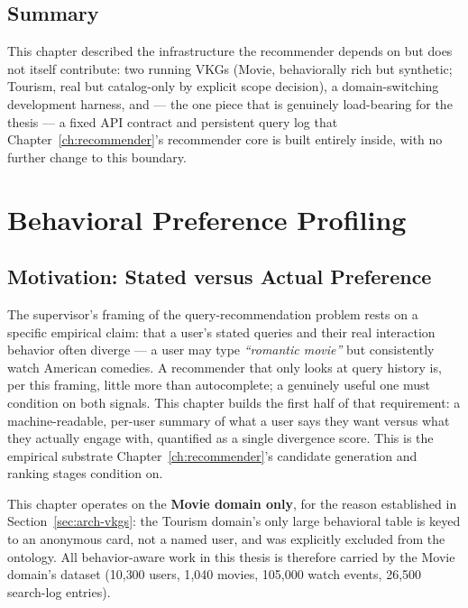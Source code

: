 \documentclass[11pt,a4paper,oneside]{book}
\begin{document}
\section{Summary}

This chapter described the infrastructure the recommender depends on but does not itself
contribute: two running VKGs (Movie, behaviorally rich but synthetic; Tourism, real but
catalog-only by explicit scope decision), a domain-switching development harness, and --- the one
piece that is genuinely load-bearing for the thesis --- a fixed API contract and persistent
query log that Chapter~\ref{ch:recommender}'s recommender core is built entirely inside, with no
further change to this boundary.

\chapter{Behavioral Preference Profiling}
\label{ch:behavior}

\section{Motivation: Stated versus Actual Preference}
\label{sec:behavior-motivation}

The supervisor's framing of the query-recommendation problem rests on a specific empirical claim:
that a user's stated queries and their real interaction behavior often diverge --- a user may type
\emph{``romantic movie''} but consistently watch American comedies. A recommender that only looks
at query history is, per this framing, little more than autocomplete; a genuinely useful one must
condition on both signals. This chapter builds the first half of that requirement: a
machine-readable, per-user summary of what a user says they want versus what they actually engage
with, quantified as a single divergence score. This is the empirical substrate
Chapter~\ref{ch:recommender}'s candidate generation and ranking stages condition on.

This chapter operates on the \textbf{Movie domain only}, for the reason established in
Section~\ref{sec:arch-vkgs}: the Tourism domain's only large behavioral table is keyed to an
anonymous card, not a named user, and was explicitly excluded from the ontology. All
behavior-aware work in this thesis is therefore carried by the Movie domain's dataset (10{,}300
users, 1{,}040 movies, 105{,}000 watch events, 26{,}500 search-log entries).
\end{document}
